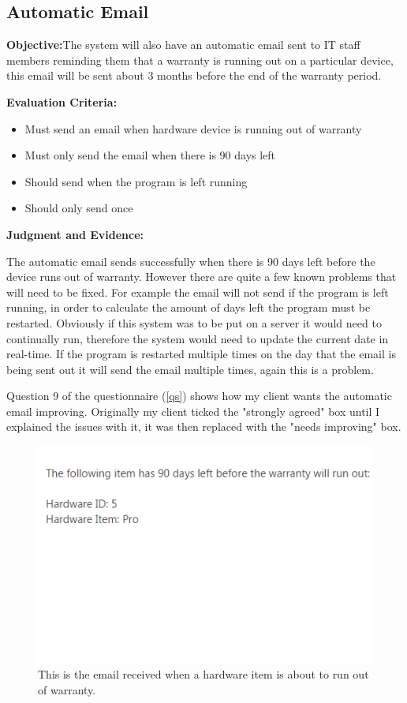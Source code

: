 \subsection{Automatic Email}

\textbf{Objective:}The system will also have an automatic email sent to IT staff members reminding them that a warranty is running out on a particular device, this email will be sent about 3 months before the end of the warranty period.

\textbf{Evaluation Criteria:}
\begin{itemize}
\item{Must send an email when hardware device is running out of warranty}
\item{Must only send the email when there is 90 days left}
\item{Should send when the program is left running}
\item{Should only send once}
\end{itemize}

\textbf{Judgment and Evidence:}

The automatic email sends successfully when there is 90 days left before the device runs out of warranty. However there are quite a few known problems that will need to be fixed. For example the email will not send if the program is left running, in order to calculate the amount of days left the program must be restarted. Obviously if this system was to be put on a server it would need to continually run, therefore the system would need to update the current date in real-time. If the program is restarted multiple times on the day that the email is being sent out it will send the email multiple times, again this is a problem.

Question 9 of the questionnaire (\ref{qs}) shows how my client wants the automatic email improving. Originally my client ticked the "strongly agreed" box until I explained the issues with it, it was then replaced with the "needs improving" box.

\begin{figure}[H]
    \includegraphics[width=\textwidth]{./Testing/Images/EmailExpiredHardware.png}
    \caption{This is the email received when a hardware item is about to run out of warranty.} 
\end{figure}


